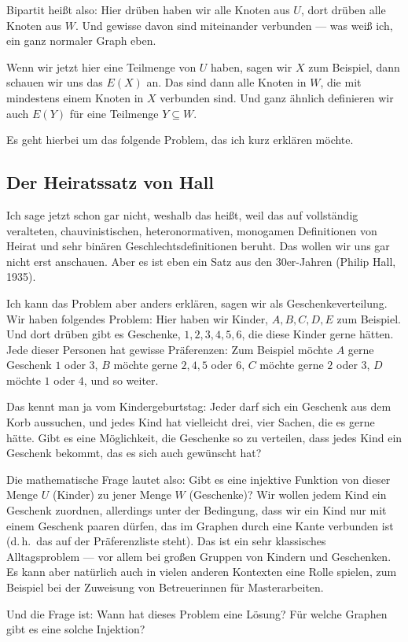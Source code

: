 \begin{spoken-clean}[00:56:47 - 00:58:37]
Bipartit heißt also: Hier drüben haben wir alle Knoten aus $U$, dort drüben alle Knoten aus $W$.  Und gewisse davon sind miteinander verbunden --- was weiß ich, ein ganz normaler Graph eben.

Wenn wir jetzt hier eine Teilmenge von $U$ haben, sagen wir $X$ zum Beispiel, dann schauen wir uns das $E(X)$ an. Das sind dann alle Knoten in $W$, die mit mindestens einem Knoten in $X$ verbunden sind. Und ganz ähnlich definieren wir auch $E(Y)$ für eine Teilmenge $Y \subseteq W$.

Es geht hierbei um das folgende Problem, das ich kurz erklären möchte. 
\end{spoken-clean}

\subsection{Der Heiratssatz von Hall}

\begin{spoken-clean}[00:58:37 - 01:01:27]
Ich sage jetzt schon gar nicht, weshalb das  heißt, weil das auf vollständig veralteten, chauvinistischen, heteronormativen, monogamen Definitionen von Heirat und sehr binären Geschlechtsdefinitionen beruht. Das wollen wir uns gar nicht erst anschauen. Aber es ist eben ein Satz aus den 30er-Jahren (Philip Hall, 1935).

Ich kann das Problem aber anders erklären, sagen wir als Geschenkeverteilung. Wir haben folgendes Problem: Hier haben wir Kinder, $A, B, C, D, E$ zum Beispiel. Und dort drüben gibt es Geschenke, $1, 2, 3, 4, 5, 6$, die diese Kinder gerne hätten. Jede dieser Personen hat gewisse Präferenzen: Zum Beispiel möchte $A$ gerne Geschenk $1$ oder $3$, $B$ möchte gerne $2, 4, 5$ oder $6$, $C$ möchte gerne $2$ oder $3$, $D$ möchte $1$ oder $4$, und so weiter.

Das kennt man ja vom Kindergeburtstag: Jeder darf sich ein Geschenk aus dem Korb aussuchen, und jedes Kind hat vielleicht drei, vier Sachen, die es gerne hätte. Gibt es eine Möglichkeit, die Geschenke so zu verteilen, dass jedes Kind ein Geschenk bekommt, das es sich auch gewünscht hat?

Die mathematische Frage lautet also: Gibt es eine injektive Funktion von dieser Menge $U$ (Kinder) zu jener Menge $W$ (Geschenke)? Wir wollen jedem Kind ein Geschenk zuordnen, allerdings unter der Bedingung, dass wir ein Kind nur mit einem Geschenk paaren dürfen, das im Graphen durch eine Kante verbunden ist (d.\,h.\ das auf der Präferenzliste steht). Das ist ein sehr klassisches Alltagsproblem --- vor allem bei großen Gruppen von Kindern und Geschenken. Es kann aber natürlich auch in vielen anderen Kontexten eine Rolle spielen, zum Beispiel bei der Zuweisung von Betreuerinnen für Masterarbeiten.

Und die Frage ist: Wann hat dieses Problem eine Lösung? Für welche Graphen gibt es eine solche Injektion?
\end{spoken-clean}

